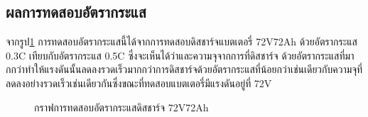 \subsection{ผลการทดสอบอัตรากระแส}
จากรูป\ref{fig:C_rate_Test} การทดสอบอัตรากระแสนี้ได้จากการทดสอบดิสชาร์จแบตเตอรี่ 72V72Ah ด้วยอัตรากระแส 0.3C เทียบกับอัตรากระแส 0.5C ซึ่งจะเห็นได้ว่าและความจุจากการที่ดิสชาร์จ
ด้วยอัตรากระแสที่มากกว่าทำให้แรงดันนั้นลดลงรวดเร็วมากกว่าการดิสชาร์จด้วยอัตรากระแสที่น้อยกว่าเช่นเดียวกับความจุที่ลดลงอย่างรวดเร็วเช่นเดียวกันซึ่งขณะที่ทดสอบแบตเตอรี่มีแรงดันอยู่ที่ 72V
\begin{center}
	\begin{figure}[H]
		\centering
		\captionsetup{justification=centering,margin=2cm}
		\caption{กราฟการทดสอบอัตรากระแสดิสชาร์จ 72V72Ah}
		\label{fig:C_rate_Test}
	\end{figure}
\end{center}